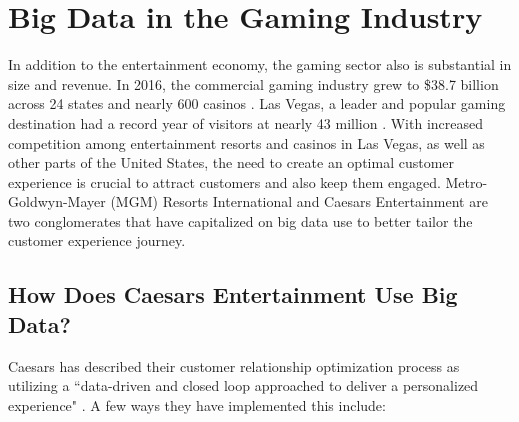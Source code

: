 \documentclass[sigconf]{acmart}
\begin{document}
\section{Big Data in the Gaming Industry}
In addition to the entertainment economy, the gaming sector also is substantial in size and revenue. In 2016, the commercial gaming industry grew to \$38.7 billion across 24 states and nearly 600 casinos \cite{Rubinrown2017}. Las Vegas, a leader and popular gaming destination had a record year of visitors at nearly 43 million \cite{Rubinrown2017}. With increased competition among entertainment resorts and casinos in Las Vegas, as well as other parts of the United States, the need to create an optimal customer experience is crucial to attract customers and also keep them engaged. Metro-Goldwyn-Mayer (MGM) Resorts International and Caesars Entertainment are two conglomerates that have capitalized on big data use to better tailor the customer experience journey. 
\subsection{How Does Caesars Entertainment Use Big Data?}
Caesars has described their customer relationship optimization process as utilizing a ``data-driven and closed loop approached to deliver a personalized experience" \cite{Welch2012}. A few ways they have implemented this include:
\end{document}
